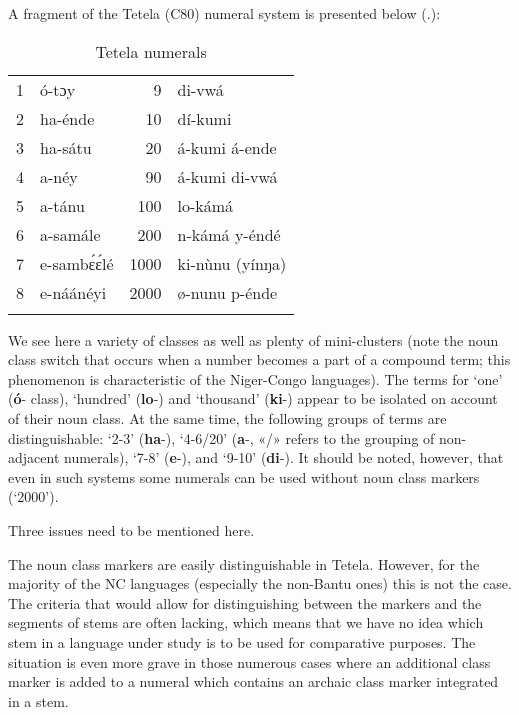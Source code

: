 A fragment of the Tetela (C80) numeral system is presented below (.):


\begin{table}
\caption{Tetela numerals}
\label{tab:1:1}

\begin{tabularx}{\textwidth}{rXrX}
\lsptoprule

1 & {\'{o}}-tɔy & 9 & di-vwá\\
2 & ha-{\'{e}}nde & 10 & dí-kumi\\
3 & ha-sátu & 20 & á-kumi á-ende\\
4 & a-n{\'{e}}y & 90 & á-kumi di-vwá\\
5 & a-tánu & 100 & lo-kámá\\
6 & a-samále & 200 & n-kámá y-{\'{e}}nd{\'{e}}\\
7 & e-samb{\'{ɛ}}{\'{ɛ}}l{\'{e}} & 1000 & ki-n{\`{u}}nu (yínŋa)\\
8 & e-náán{\'{e}}yi & 2000 & ø-nunu p-{\'{e}}nde\\
\lspbottomrule
\end{tabularx}
\end{table}

We see here a variety of classes as well as plenty of mini-clusters (note the noun class switch that occurs when a number becomes a part of a compound term; this phenomenon is characteristic of the Niger-Congo languages). The terms for ‘one’ (\textbf{{\'{o}}}- class), ‘hundred’ (\textbf{lo}-) and ‘thousand’ (\textbf{ki}-) appear to be isolated on account of their noun class. At the same time, the following groups of terms are distinguishable: ‘2-3’ (\textbf{ha}-), ‘4-6/20’ (\textbf{a}-, «/» refers to the grouping of non-adjacent numerals), ‘7-8’ (\textbf{e}-), and ‘9-10’ (\textbf{di}-).  It should be noted, however, that even in such systems some numerals can be used without noun class markers (‘2000’). 

Three issues need to be mentioned here.

The noun class markers are easily distinguishable in Tetela. However, for the majority of the NC languages (especially the non-Bantu ones) this is not the case. The criteria that would allow for distinguishing between the markers and the segments of stems are often lacking, which means that we have no idea which stem in a language under study is to be used for comparative purposes. The situation is even more grave in those numerous cases where an additional class marker is added to a numeral which contains an archaic class marker integrated in a stem.

